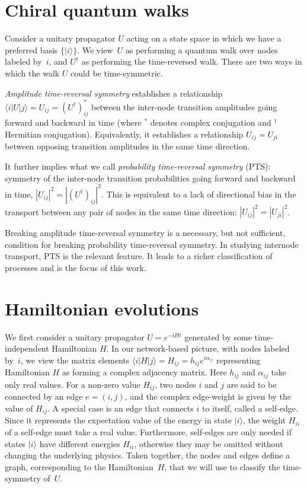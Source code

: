 \documentclass[aps,prx,10pt,
               superscriptaddress,
               twocolumn,
               longbibliography,
showpacs]{revtex4-1}
\theoremstyle{plain}
\theoremstyle{definition}
\newcommand{\bra}[1]{\mbox{$\langle #1|$}}
\newcommand{\ket}[1]{\ensuremath{|#1\rangle}}
\begin{document}
\section{Chiral quantum walks}
Consider a unitary propagator $U$ acting on a state
space in which we have a preferred basis $\{ \ket{i} \}$. We view~$U$ as performing a quantum walk
over nodes labeled by~$i$, and $U^\dagger$ as performing the time-reversed walk. There are two ways in which the walk $U$ could be time-symmetric.

{\it Amplitude time-reversal symmetry} establishes a
relationship $ \bra{i} U \ket{j} = U_{ij} = ( U^\dagger )^\ast_{ij}$
between the inter-node transition amplitudes going forward and backward in time
(where $^\ast$ denotes complex conjugation and $^\dagger$ Hermitian
conjugation).  Equivalently, it establishes a
relationship $U_{ij} = U_{ji}$ between opposing transition
amplitudes in the same time direction.

It further implies what we call {\it probability time-reversal symmetry} (PTS):
symmetry of the inter-node transition probabilities going forward and backward in time,
$| U_{ij} |^2 = | (U^\dagger)_{ij} |^2$.
This is equivalent to a lack of directional bias
in the transport between any pair of nodes
in the same time direction:
$| U_{ij} |^2  = | U_{ji} |^2$.

Breaking amplitude time-reversal symmetry is a necessary, but not sufficient, condition 
for breaking probability time-reversal symmetry.
In studying internode transport, PTS is the relevant feature.
It leads to a richer classification of processes and is the focus of this work.

\section{Hamiltonian evolutions}
We first consider a unitary propagator $U = e^{-i H t}$ generated by some time-independent Hamiltonian $H$. In our network-based picture, with nodes labeled by~$i$,
we view the matrix elements $\bra{i} H \ket{j} = H_{ij} =h_{ij}e^{i\alpha_{ij}}$ representing Hamiltonian $H$ as forming a complex adjacency matrix. Here $h_{ij}$ and $\alpha_{ij}$
take only real values. For a non-zero value $H_{ij}$, two nodes $i$ and $j$ are said to be connected by an edge
$e = (i, j)$, and the complex edge-weight is given by the value of $H_{ij}$. A special case is an edge that connects $i$ to itself, called a self-edge.
Since it represents the expectation value of the  energy in state $\ket{i}$, the weight $H_{ii}$
of a self-edge must take a real value. Furthermore, self-edges are
only needed if states $\ket{i}$ have different energies $H_{ii}$,
otherwise they may be omitted without changing the underlying physics.
Taken together, the nodes and edges
define a graph, corresponding to the Hamiltonian~$H$, that we will use
to classify the time-symmetry of~$U$.
\end{document}
